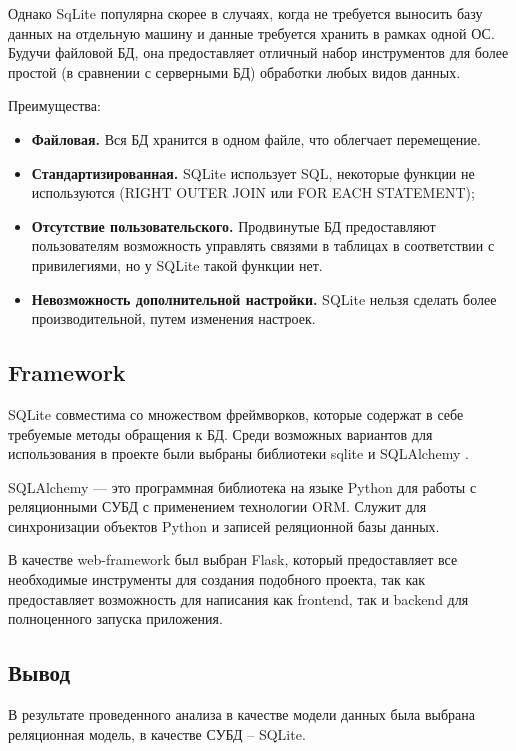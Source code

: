 Однако SqLite популярна скорее в случаях, когда не требуется выносить базу данных на отдельную машину и данные требуется хранить в рамках одной ОС. Будучи файловой БД, она предоставляет отличный набор инструментов для более простой (в сравнении с серверными БД) обработки любых видов данных. \cite{1}

Преимущества:

\begin{itemize}
	\item {\bf Файловая.} Вся БД хранится в одном файле, что облегчает перемещение.
	\item {\bf Стандартизированная.} SQLite использует SQL, некоторые функции не используются (RIGHT OUTER JOIN или FOR EACH STATEMENT);
	\item {\bf Отсутствие пользовательского.} Продвинутые БД предоставляют пользователям возможность управлять связями в таблицах в соответствии с привилегиями, но у SQLite такой функции нет.
	\item {\bf Невозможность дополнительной настройки.} SQLite нельзя сделать более производительной, путем изменения настроек.
\end{itemize}

\subsection{Framework}%
 \setcounter{subsection}{5}
 
 SQLite совместима со множеством фреймворков, которые содержат в себе требуемые методы обращения к БД. Среди возможных вариантов для использования в проекте были выбраны библиотеки sqlite и SQLAlchemy \cite{2}.

SQLAlchemy — это программная библиотека на языке Python для работы с реляционными СУБД с применением технологии ORM. Служит для синхронизации объектов Python и записей реляционной базы данных.



В качестве web-framework был выбран Flask, который предоставляет все необходимые инструменты для создания подобного проекта, так как предоставляет возможность для написания как frontend, так и backend для полноценного запуска приложения.

\subsection{Вывод}%
\setcounter{subsection}{6}

В результате проведенного анализа в качестве модели данных была выбрана реляционная модель, в качестве СУБД – SQLite.

